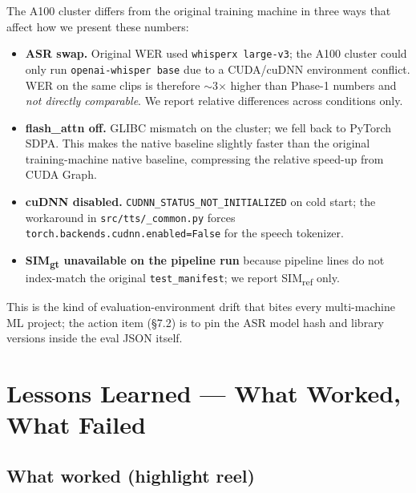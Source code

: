\documentclass[10pt,a4paper]{article}
\begin{document}
The A100 cluster differs from the original training machine in three ways
that affect how we present these numbers:

\begin{itemize}
  \item \textbf{ASR swap.} Original WER used \texttt{whisperx large-v3};
        the A100 cluster could only run \texttt{openai-whisper base} due
        to a CUDA/cuDNN environment conflict. WER on the same clips is
        therefore $\sim$3$\times$ higher than Phase-1 numbers and
        \emph{not directly comparable}. We report relative differences
        across conditions only.
  \item \textbf{flash\_attn off.} GLIBC mismatch on the cluster; we fell
        back to PyTorch SDPA. This makes the native baseline slightly
        faster than the original training-machine native baseline,
        compressing the relative speed-up from CUDA Graph.
  \item \textbf{cuDNN disabled.} \texttt{CUDNN\_STATUS\_NOT\_INITIALIZED}
        on cold start; the workaround in \texttt{src/tts/\_common.py}
        forces \texttt{torch.backends.cudnn.enabled=False} for the speech
        tokenizer.
  \item \textbf{SIM\textsubscript{gt} unavailable on the pipeline run}
        because pipeline lines do not index-match the original
        \texttt{test\_manifest}; we report SIM\textsubscript{ref} only.
\end{itemize}

This is the kind of evaluation-environment drift that bites every
multi-machine ML project; the action item (\S7.2) is to pin the ASR model
hash and library versions inside the eval JSON itself.

\section{Lessons Learned --- What Worked, What Failed}

\subsection{What worked (highlight reel)}
\end{document}
